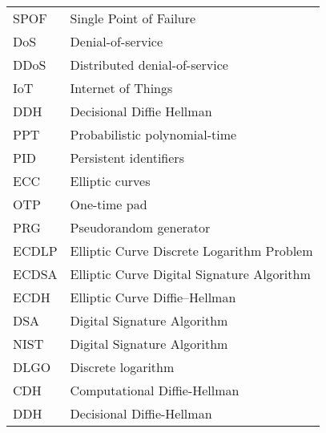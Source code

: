 \begin{center}
\begin{longtable}{ l @{\qquad} l }
	SPOF    & Single Point of Failure \\
	DoS    & Denial-of-service \\
	DDoS    & Distributed denial-of-service \\
	IoT    & Internet of Things \\
	DDH    & Decisional Diffie Hellman \\
	PPT    & Probabilistic polynomial-time \\
	PID    & Persistent identifiers \\
	ECC    & Elliptic curves \\
	OTP    & One-time pad\\
	PRG    & Pseudorandom generator\\
	ECDLP    & Elliptic Curve Discrete Logarithm Problem\\
	ECDSA    & Elliptic Curve Digital Signature Algorithm\\
	ECDH    & Elliptic Curve Diffie–Hellman\\
	DSA    & Digital Signature Algorithm\\
	NIST    & Digital Signature Algorithm\\
	DLGO    & Discrete logarithm\\
	CDH    & Computational Diffie-Hellman\\
	DDH    & Decisional Diffie-Hellman\\
	\bottomrule
	\end{longtable}
\end{center}

